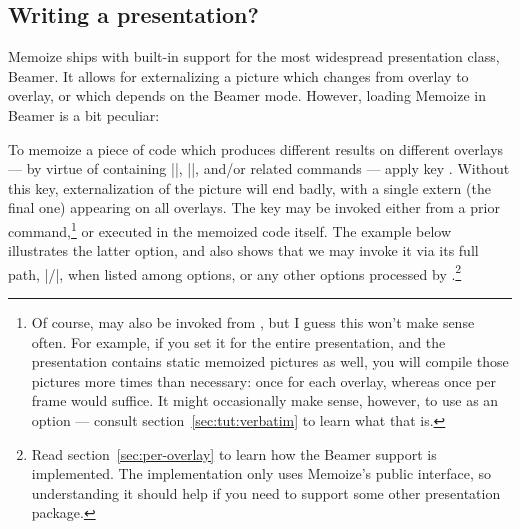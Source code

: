 \documentclass[a4paper,11pt]{article}
\begin{document}
\subsection{Writing a presentation?}
\label{sec:tut:beamer}

Memoize ships with built-in support for the most widespread 
presentation class, Beamer.  It allows for externalizing a picture which
changes from overlay to overlay, or which depends on the Beamer mode.  However,
loading Memoize in Beamer is a bit peculiar:


To memoize a piece of code which produces different results on different
overlays --- by virtue of containing |\pause|, |\only|, and\slash or related
commands --- apply key .  Without this key,
externalization of the picture will end badly, with a single extern (the final
one) appearing on all overlays.  The key may be invoked either from a prior
 command,\footnote{Of course,  may also be
  invoked from , but I guess this won't make sense often.  For
  example, if you set it for the entire presentation, and the presentation
  contains static memoized pictures as well, you will compile those pictures
  more times than necessary: once for each overlay, whereas once per frame
  would suffice.  It might occasionally make sense, however, to use  as an  option --- consult
  section~\ref{sec:tut:verbatim} to learn what that is.}  or executed in the
memoized code itself.  The example below illustrates the latter option, and
also shows that we may invoke it via its full path,
|/|, when listed among \TikZ options, or
any other options processed by .\footnote{Read
  section~\ref{sec:per-overlay} to learn how the Beamer support is implemented.
  The implementation only uses Memoize's public interface, so understanding it
  should help if you need to support some other presentation package.}
\end{document}
